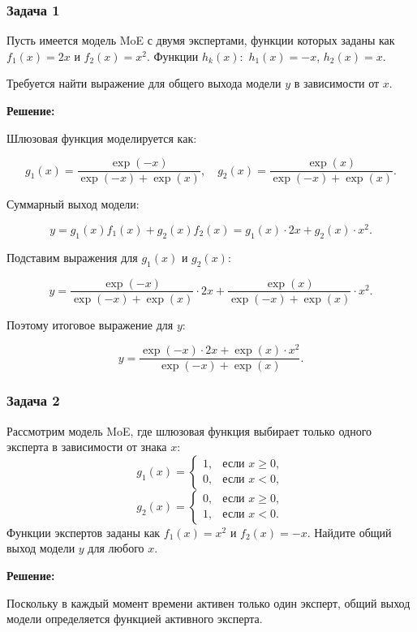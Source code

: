\subsubsection{Задача 1}

Пусть имеется модель MoE с двумя экспертами, функции которых заданы как $f_1(x) = 2x$ и $f_2(x) = x^2$. Функции $h_k (x):$ $h_1 (x) = -x$, $h_2 (x) = x$.

Требуется найти выражение для общего выхода модели $y$ в зависимости от $x$.

\textbf{Решение:}

Шлюзовая функция моделируется как:

$$
    g_1(x) = \frac{\exp(-x)}{\exp(-x) + \exp(x)}, \quad g_2(x) = \frac{\exp(x)}{\exp(-x) + \exp(x)}.
$$

Суммарный выход модели:

$$
    y = g_1(x) f_1(x) + g_2(x) f_2(x) = g_1(x) \cdot 2x + g_2(x) \cdot x^2.
$$

Подставим выражения для $g_1(x)$ и $g_2(x)$:

$$
    y = \frac{\exp(-x)}{\exp(-x) + \exp(x)} \cdot 2x + \frac{\exp(x)}{\exp(-x) + \exp(x)} \cdot x^2.
$$

Поэтому итоговое выражение для $y$:

$$
    y = \frac{\exp(-x) \cdot 2x + \exp(x) \cdot x^2}{\exp(-x) + \exp(x)}.
$$

\subsubsection{Задача 2}

Рассмотрим модель MoE, где шлюзовая функция выбирает только одного эксперта в зависимости от знака $x$:
$$
    g_1(x) =
    \begin{cases}
        1, & \text{если } x \geq 0, \\
        0, & \text{если } x < 0,
    \end{cases}
$$
$$
    g_2(x) =
    \begin{cases}
        0, & \text{если } x \geq 0, \\
        1, & \text{если } x < 0.
    \end{cases}
$$
Функции экспертов заданы как $f_1(x) = x^2$ и $f_2(x) = -x$. Найдите общий выход модели $y$ для любого $x$.

\textbf{Решение:}

Поскольку в каждый момент времени активен только один эксперт, общий выход модели определяется функцией активного эксперта.

